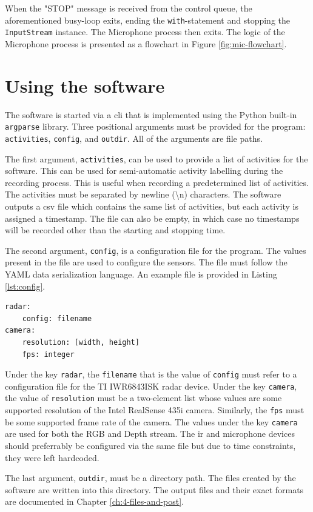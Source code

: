 When the "STOP" message is received from the control queue,
the aforementioned busy-loop exits, ending the \texttt{with}-statement and stopping the \texttt{InputStream} instance.
The Microphone process then exits.
The logic of the Microphone process is presented as a flowchart in Figure \ref{fig:mic-flowchart}.

\section{Using the software}
\label{sec:3-usage}
The software is started via a \gls{cli} that is implemented using the Python built-in \texttt{argparse} library.
Three positional arguments must be provided for the program: \texttt{activities}, \texttt{config}, and \texttt{outdir}.
All of the arguments are file paths.

The first argument, \texttt{activities}, can be used to provide a list of activities for the software.
This can be used for semi-automatic activity labelling during the recording process.
This is useful when recording a predetermined list of activities.
The activities must be separated by newline ({\textbackslash}n) characters.
The software outputs a \gls{csv} file which contains the same list of activities,
but each activity is assigned a timestamp.
The file can also be empty, in which case no timestamps will be recorded other than the starting and stopping time.

The second argument, \texttt{config}, is a configuration file for the program.
The values present in the file are used to configure the sensors.
The file must follow the YAML data serialization language.
An example file is provided in Listing \ref{lst:config}.

\begin{lstlisting}[language=Python,caption={Example configuration file.},label={lst:config}]
radar:
    config: filename
camera:
    resolution: [width, height]
    fps: integer
\end{lstlisting}

Under the key \texttt{radar}, the \texttt{filename} that is the value of \texttt{config} must refer to a configuration file for the TI IWR6843ISK radar device.
Under the key \texttt{camera}, the value of \texttt{resolution} must be a two-element list whose values are some supported resolution of the Intel RealSense 435i camera.
Similarly, the \texttt{fps} must be some supported frame rate of the camera.
The values under the key \texttt{camera} are used for both the RGB and Depth stream.
The \gls{ir} and microphone devices should preferrably be configured via the same file but due to time constraints,
they were left hardcoded.

The last argument, \texttt{outdir}, must be a directory path.
The files created by the software are written into this directory.
The output files and their exact formats are documented in Chapter \ref{ch:4-files-and-post}.
